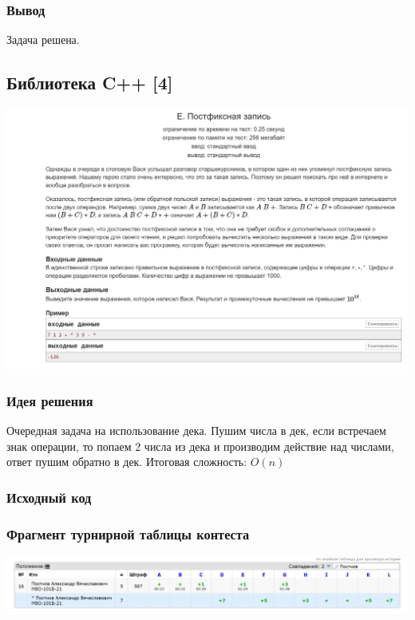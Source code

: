 \subsubsection*{Вывод}
Задача решена.

\vspace{20pt}

\pagebreak

\subsection*{Библиотека C++ [4]}
\begin{center}
\includegraphics[width=\textwidth]{statements/4.png}
\end{center}
\subsubsection*{Идея решения}
Очередная задача на использование дека. Пушим числа в дек, если встречаем знак операции, то попаем 2 числа из дека и производим действие над числами, ответ пушим обратно в дек.
Итоговая сложность: $O(n)$

\subsubsection*{Исходный код}


\subsubsection*{Фрагмент турнирной таблицы контеста}
\begin{center}
\includegraphics[width=\textwidth]{standings/4.png}\newline\noindent
\end{center}

